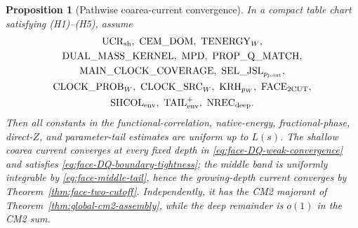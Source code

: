 \documentclass[11pt]{article}
\newtheorem{proposition}[theorem]{Proposition}
\begin{document}
\begin{proposition}[Pathwise coarea-current convergence]
\label{prop:common-refinement-majorant}
In a compact table chart satisfying \textup{(H1)--(H5)}, assume
\[
\begin{gathered}
 \mathrm{UCR}_{\rm sh},\ \mathrm{CEM\_DOM},\ \mathrm{TENERGY}_{W},\\
 \mathrm{DUAL\_MASS\_KERNEL},\ \mathrm{MPD},\
 \mathrm{PROP\_Q\_MATCH},\\
 \mathrm{MAIN\_CLOCK\_COVERAGE},\
 \mathrm{SEL\_JSL}_{p_{\rm joint}},\\
 \mathrm{CLOCK\_PROB}_{W},\ \mathrm{CLOCK\_SRC}_{W},\
 \mathrm{KRH}_{p_W},\ \mathrm{FACE}_{\rm 2CUT},\\
 \mathrm{SHCOL}_{\rm env},\ \mathrm{TAIL}_{\rm env}^{+},\
 \mathrm{NREC}_{\rm deep}.
\end{gathered}
\]
Then all constants in the
functional-correlation, native-energy, fractional-phase, direct-$Z$, and
parameter-tail estimates are uniform up to $L(s)$.  The shallow coarea current
converges at every fixed depth in
\eqref{eq:face-DQ-weak-convergence} and satisfies
\eqref{eq:face-DQ-boundary-tightness}; the middle band is uniformly
integrable by \eqref{eq:face-middle-tail}, hence the growing-depth current
converges by Theorem~\ref{thm:face-two-cutoff}.  Independently, it has the
CM2 majorant of Theorem~\ref{thm:global-cm2-assembly}, while the deep
remainder is $o(1)$ in the CM2 sum.
\end{proposition}
\end{document}
